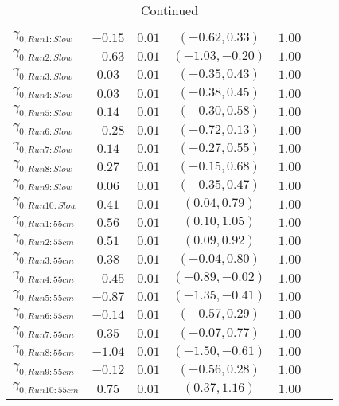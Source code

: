 \documentclass{article}
\begin{document}
\setcounter{table}{3}
\begin{table}[!ht]
\caption{Continued}
\label{Table:NxRateFinalModel2}
\centering
\begin{tabular}{l c c c c c c} \hline
$\gamma_{0,Run1:Slow}$        & $-0.15$ & $0.01$ & $(-0.62, 0.33)$ & $1.00$ \\
$\gamma_{0,Run2:Slow}$        & $-0.63$ & $0.01$ & $(-1.03,-0.20)$ & $1.00$ \\
$\gamma_{0,Run3:Slow}$        & $ 0.03$ & $0.01$ & $(-0.35, 0.43)$ & $1.00$ \\
$\gamma_{0,Run4:Slow}$        & $ 0.03$ & $0.01$ & $(-0.38, 0.45)$ & $1.00$ \\
$\gamma_{0,Run5:Slow}$        & $ 0.14$ & $0.01$ & $(-0.30, 0.58)$ & $1.00$ \\
$\gamma_{0,Run6:Slow}$        & $-0.28$ & $0.01$ & $(-0.72, 0.13)$ & $1.00$ \\
$\gamma_{0,Run7:Slow}$        & $ 0.14$ & $0.01$ & $(-0.27, 0.55)$ & $1.00$ \\
$\gamma_{0,Run8:Slow}$        & $ 0.27$ & $0.01$ & $(-0.15, 0.68)$ & $1.00$ \\
$\gamma_{0,Run9:Slow}$        & $ 0.06$ & $0.01$ & $(-0.35, 0.47)$ & $1.00$ \\
$\gamma_{0,Run10:Slow}$       & $ 0.41$ & $0.01$ & $( 0.04, 0.79)$ & $1.00$ \\
$\gamma_{0,Run1:55cm}$        & $ 0.56$ & $0.01$ & $( 0.10, 1.05)$ & $1.00$ \\
$\gamma_{0,Run2:55cm}$        & $ 0.51$ & $0.01$ & $( 0.09, 0.92)$ & $1.00$ \\
$\gamma_{0,Run3:55cm}$        & $ 0.38$ & $0.01$ & $(-0.04, 0.80)$ & $1.00$ \\
$\gamma_{0,Run4:55cm}$        & $-0.45$ & $0.01$ & $(-0.89,-0.02)$ & $1.00$ \\
$\gamma_{0,Run5:55cm}$        & $-0.87$ & $0.01$ & $(-1.35,-0.41)$ & $1.00$ \\
$\gamma_{0,Run6:55cm}$        & $-0.14$ & $0.01$ & $(-0.57, 0.29)$ & $1.00$ \\
$\gamma_{0,Run7:55cm}$        & $ 0.35$ & $0.01$ & $(-0.07, 0.77)$ & $1.00$ \\
$\gamma_{0,Run8:55cm}$        & $-1.04$ & $0.01$ & $(-1.50,-0.61)$ & $1.00$ \\
$\gamma_{0,Run9:55cm}$        & $-0.12$ & $0.01$ & $(-0.56, 0.28)$ & $1.00$ \\
$\gamma_{0,Run10:55cm}$       & $ 0.75$ & $0.01$ & $( 0.37, 1.16)$ & $1.00$ \\

\end{tabular}
\end{table}
\end{document}
